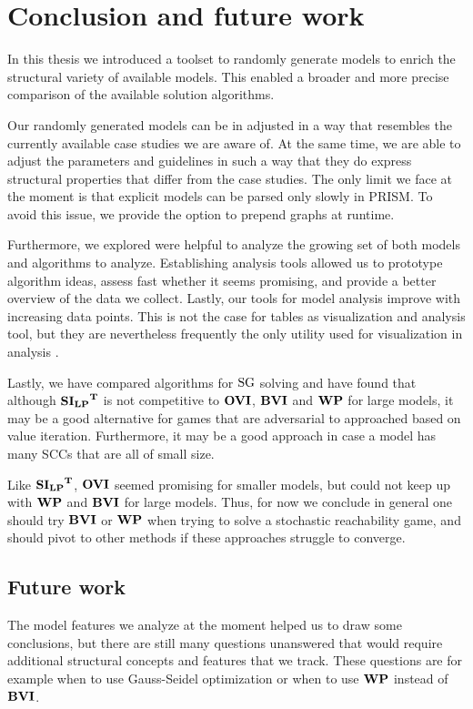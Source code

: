 \chapter{Conclusion and future work} \label{ch:conclusion}
In this thesis we introduced a toolset to randomly generate models to enrich the structural variety of available models.
This enabled a broader and more precise comparison of the available solution algorithms.

Our randomly generated models can be in adjusted in a way that resembles the currently available case studies we are aware of.
At the same time, we are able to adjust the parameters and guidelines in such a way that they do express structural properties that differ from the case studies.
The only limit we face at the moment is that explicit models can be parsed only slowly in PRISM. 
To avoid this issue, we provide the option to prepend graphs at runtime.

Furthermore, we explored were helpful to analyze the growing set of both models and algorithms to analyze.
Establishing analysis tools allowed us to prototype algorithm ideas, assess fast whether it seems promising,
and provide a better overview of the data we collect. 
Lastly, our tools for model analysis improve with increasing data points.
This is not the case for tables as visualization and analysis tool, 
but they are nevertheless frequently the only utility used for visualization in analysis \cite{paperMaxi}\cite{widestPath}\cite{learningBased}.

Lastly, we have compared algorithms for $\textrm{SG}$ solving and have found that although $\mathbf{\mathbf{SI_{LP}}^T}$ is not competitive to $\mathbf{OVI}$, $\mathbf{BVI}$ and $\mathbf{WP}$ for large models,
it may be a good alternative for games that are adversarial to approached based on value iteration. 
Furthermore, it may be a good approach in case a model has many SCCs that are all of small size.

Like $\mathbf{\mathbf{SI_{LP}}^T}$, $\mathbf{OVI}$ seemed promising for smaller models, but could not keep up with $\mathbf{WP}$ and $\mathbf{BVI}$ for large models.
Thus, for now we conclude in general one should try $\mathbf{BVI}$ or $\mathbf{WP}$ when trying to solve a stochastic reachability game, 
and should pivot to other methods if these approaches struggle to converge.

\section*{Future work}
The model features we analyze at the moment helped us to draw some conclusions, but there are still many questions unanswered that would require
additional structural concepts and features that we track.
These questions are for example when to use Gauss-Seidel optimization or when to use $\mathbf{WP}$ instead of $\mathbf{BVI}$.

